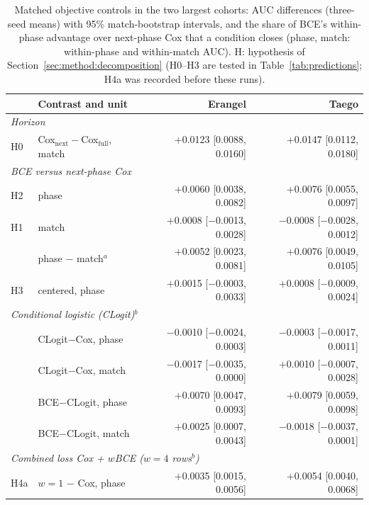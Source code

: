 \begin{table}[t]
\centering\footnotesize
\caption{Matched objective controls in the two largest cohorts: AUC differences (three-seed means) with 95\% match-bootstrap intervals, and the share of BCE's within-phase advantage over next-phase Cox that a condition closes (phase, match: within-phase and within-match AUC). H: hypothesis of Section~\ref{sec:method:decomposition} (H0--H3 are tested in Table~\ref{tab:predictions}; H4a was recorded before these runs).}
\label{tab:objective}
\setlength{\tabcolsep}{1.6pt}
\begin{tabular}{@{}llrr@{}}
\toprule
 & Contrast and unit & Erangel & Taego \\
\midrule
\multicolumn{4}{l}{\emph{Horizon}} \\
H0 & Cox$_{\mathrm{next}}-$Cox$_{\mathrm{full}}$, match & $+$0.0123 {\scriptsize[0.0088, 0.0160]} & $+$0.0147 {\scriptsize[0.0112, 0.0180]} \\
\multicolumn{4}{l}{\emph{BCE versus next-phase Cox}} \\
H2 & phase & $+$0.0060 {\scriptsize[0.0038, 0.0082]} & $+$0.0076 {\scriptsize[0.0055, 0.0097]} \\
H1 & match & $+$0.0008 {\scriptsize[$-$0.0013, 0.0028]} & $-$0.0008 {\scriptsize[$-$0.0028, 0.0012]} \\
 & phase $-$ match$^{a}$ & $+$0.0052 {\scriptsize[0.0023, 0.0081]} & $+$0.0076 {\scriptsize[0.0049, 0.0105]} \\
H3 & centered, phase & $+$0.0015 {\scriptsize[$-$0.0003, 0.0033]} & $+$0.0008 {\scriptsize[$-$0.0009, 0.0024]} \\
\multicolumn{4}{l}{\emph{Conditional logistic (CLogit)$^{b}$}} \\
 & CLogit$-$Cox, phase & $-$0.0010 {\scriptsize[$-$0.0024, 0.0003]} & $-$0.0003 {\scriptsize[$-$0.0017, 0.0011]} \\
 & CLogit$-$Cox, match & $-$0.0017 {\scriptsize[$-$0.0035, 0.0000]} & $+$0.0010 {\scriptsize[$-$0.0007, 0.0028]} \\
 & BCE$-$CLogit, phase & $+$0.0070 {\scriptsize[0.0047, 0.0093]} & $+$0.0079 {\scriptsize[0.0059, 0.0098]} \\
 & BCE$-$CLogit, match & $+$0.0025 {\scriptsize[0.0007, 0.0043]} & $-$0.0018 {\scriptsize[$-$0.0037, 0.0001]} \\
\multicolumn{4}{l}{\emph{Combined loss Cox + $w$BCE ($w{=}4$ rows$^{b}$)}} \\
H4a & $w{=}1$ $-$ Cox, phase & $+$0.0035 {\scriptsize[0.0015, 0.0056]} & $+$0.0054 {\scriptsize[0.0040, 0.0068]} \\

\end{tabular}
\end{table}
